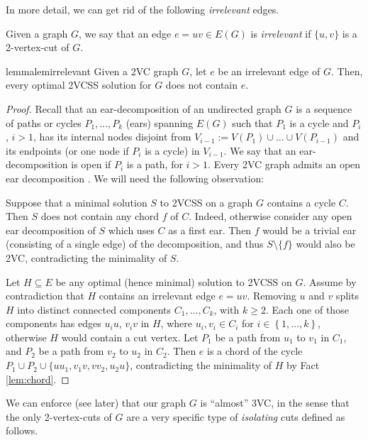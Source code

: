 \documentclass{theoretics}
\newcommand{\set}[1]{\left\{#1 \right\}}
\begin{document}
In more detail, we can get rid of the following \emph{irrelevant} edges.
\begin{definition}
Given a graph $G$, we say that an edge $e=uv\in E(G)$ is \emph{irrelevant} if $\{u,v\}$ is a 2-vertex-cut of $G$.
\end{definition}
\begin{restatable}{lemma}{lemirrelevant}\label{lem:irrelevant}
Given a 2VC graph $G$, let $e$ be an irrelevant edge of $G$. Then, every optimal 2VCSS solution for $G$ does not contain $e$.
\end{restatable}
\begin{proof}
Recall that an ear-decomposition of an undirected graph $G$ is a sequence of paths or cycles $P_1,\ldots,P_k$ (ears) spanning $E(G)$ such that $P_1$ is a cycle and $P_i$, $i > 1$, has its internal nodes disjoint from $V_{i-1}:=V(P_1)\cup\ldots\cup V(P_{i-1})$ and its endpoints (or one node if $P_i$ is a cycle) in $V_{i-1}$. We say that an ear-decomposition is open if $P_i$ is a path, for $i > 1$. Every 2VC graph admits an open ear decomposition \cite[Chapter~15]{S03}. We will need the following observation: 
\begin{fact}\label{lem:chord}
Suppose that a minimal solution $S$ to 2VCSS on a graph $G$ contains a cycle $C$. Then $S$ does not contain any chord $f$ of $C$. Indeed, otherwise consider any open ear decomposition of $S$ which uses $C$ as a first ear. Then $f$ would be a trivial ear (consisting of a single edge) of the decomposition, and thus $S\setminus \{f\}$ would also be 2VC, contradicting the minimality of $S$.
\end{fact}

Let $H\subseteq E$ be any optimal (hence minimal) solution to 2VCSS on $G$. Assume by contradiction that $H$ contains an irrelevant edge $e=uv$. Removing $u$ and $v$ splits $H$ into distinct connected components $C_1,\dots, C_k$, with $k\geq 2$. Each one of those components has edges $u_iu$, $v_iv$ in $H$, where $u_i, v_i\in C_i$ for $i\in \set{1,\dots, k}$, otherwise $H$ would contain a cut vertex. Let $P_1$ be a path from $u_1$ to $v_1$ in $C_1$, and $P_2$ be a path from $v_2$ to $u_2$ in $C_2$. Then $e$ is a chord of the cycle $P_1\cup P_2\cup\{uu_1,v_1v,vv_2,u_2u\}$, contradicting the minimality of $H$ by Fact \ref{lem:chord}.
\end{proof}
We can enforce (see later) that our graph $G$ is ``almost'' 3VC, in the sense that the only 2-vertex-cuts of $G$ are a very specific type of \emph{isolating} cuts defined as follows.
\end{document}
